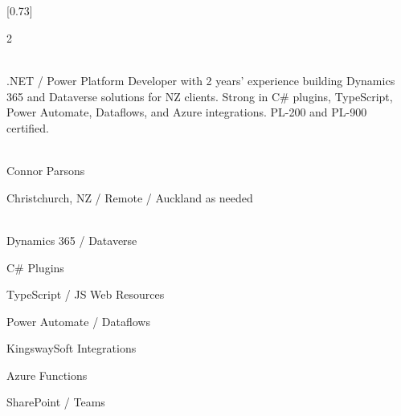 \documentclass[lighthipster]{simplehipstercv}
\begin{document}
\thispagestyle{empty}


\subsection*{}
\vspace{3em}

\setlength{\columnsep}{1cm}
[0.73]
\begin{paracol}{2}

\paracolbackgroundoptions

\footnotesize
{\setasidefontcolour
\flushright

\begin{center}
\end{center}

\\[0.3em]
{\footnotesize
.NET / Power Platform Developer with 2 years' experience building Dynamics 365 and Dataverse solutions for NZ clients. Strong in C\# plugins, TypeScript, Power Automate, Dataflows, and Azure integrations. PL-200 and PL-900 certified.}

\medskip

 \\[0.3em]
Connor Parsons

Christchurch, NZ / Remote / Auckland as needed

\medskip

 \\[0.3em]
Dynamics 365 / Dataverse

C\# Plugins

TypeScript / JS Web Resources

Power Automate / Dataflows

KingswaySoft Integrations

Azure Functions

SharePoint / Teams

\medskip

\\[0.3em]


}
\end{paracol}
\end{document}
